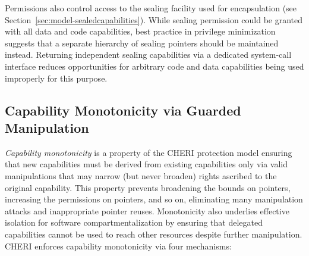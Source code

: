 Permissions also control access to the sealing facility used for encapsulation
(see Section~\ref{sec:model-sealedcapabilities}).
While sealing permission could be granted with all data and code capabilities,
best practice in privilege minimization suggests that a separate hierarchy
of sealing pointers should be maintained instead.
Returning independent sealing capabilities via a dedicated system-call
interface reduces opportunities for arbitrary code and data capabilities being
used improperly for this purpose.

\subsection{Capability Monotonicity via Guarded Manipulation}
\label{sec:model-monotonicity}

\textit{Capability monotonicity} is a property of the CHERI protection model
ensuring that new capabilities must be derived
from existing capabilities only via valid manipulations that may narrow (but
never broaden) rights ascribed to the original capability.
This property prevents broadening the bounds on pointers, increasing the
permissions on pointers, and so on, eliminating many manipulation attacks and
inappropriate pointer reuses.
Monotonicity also underlies effective isolation for software
compartmentalization by ensuring that delegated capabilities cannot be used to
reach other resources despite further manipulation.
CHERI enforces capability monotonicity via four mechanisms:


